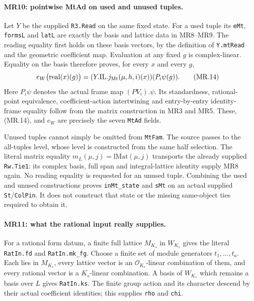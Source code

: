 \paragraph{MR10: pointwise MtAd on used and unused tuples.}
Let $Y$ be the supplied \texttt{R3.Read} on the same fixed state.
For a used tuple its \texttt{eMt}, \texttt{formsL} and
\texttt{latL} are exactly the basis and lattice data in MR8--MR9.
The reading equality first holds on these basis vectors, by the
definition of \texttt{Y.mtRead} and the geometric coefficient map.
Evaluation at any fixed $g$ is complex-linear. Equality on the
basis therefore proves, for every $x$ and every $g$,
\[
 e_W\bigl(\mathrm{real}(x)(g)\bigr)
       =(Y.\mathrm{IL}.j_{\rm Mt}(\mu,h,i)(x))(P_i\psi(g)).
                                                               \tag{MR.14}
\]
Here $P_i\psi$ denotes the actual frame map $(PV_i).\psi$.
Its standardness, rational-point equivalence, coefficient-action
intertwining and entry-by-entry identity-frame equality follow from
the matrix construction in MR3 and MR5. These, (MR.14), and $e_W$
are precisely the seven \texttt{MtAd} fields.

Unused tuples cannot simply be omitted from \texttt{MtFam}.
The source passes to the all-tuples level, whose level is constructed
from the same half selection. The literal matrix equality
$m_L(\mu,j)=\mathrm{lMat}(\mu,j)$ transports the already supplied
\texttt{Rw.Tie1}: its complex basis, full span and integral-lattice
identity supply MR8 again. No reading equality is requested for an
unused tuple. Combining the used and unused constructions proves
\texttt{inMt\_state} and \texttt{sMt} on an actual supplied
\texttt{St}/\texttt{ColPin}. It does not construct that state or
the missing same-object ties required to obtain it.

\paragraph{MR11: what the rational input really supplies.}
For a rational form datum, a finite full lattice $M_{K_s}$ in
$W_{K_s}$ gives the literal \texttt{RatIn.fd} and
\texttt{RatIn.mk\_fg}. Choose a finite set of module generators
$t_1,\ldots,t_a$. Each lies in $M_{K_s}$, every lattice vector is an
$\mathcal O_{K_s}$-linear combination of them, and every rational
vector is a $K_s$-linear combination. A basis of $W_{K_s}$ which
remains a basis over $L$ gives \texttt{RatIn.ks}. The finite group
action and its character descend by their actual coefficient
identities; this supplies \texttt{rho} and \texttt{chi}.

